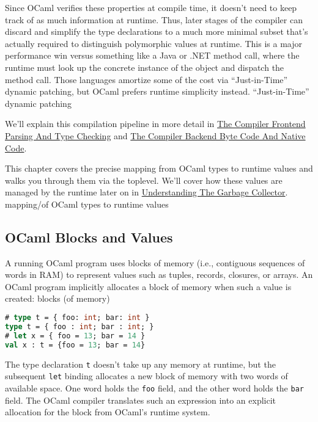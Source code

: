 Since OCaml verifies these properties at compile time, it doesn't need
to keep track of as much information at runtime. Thus, later stages of
the compiler can discard and simplify the type declarations to a much
more minimal subset that's actually required to distinguish polymorphic
values at runtime. This is a major performance win versus something like
a Java or .NET method call, where the runtime must look up the concrete
instance of the object and dispatch the method call. Those languages
amortize some of the cost via ``Just-in-Time'' dynamic patching, but
OCaml prefers runtime simplicity instead. {``Just-in-Time'' dynamic
patching}

We'll explain this compilation pipeline in more detail in
\href{compiler-frontend.html\#the-compiler-frontend-parsing-and-type-checking}{The
Compiler Frontend Parsing And Type Checking} and
\href{compiler-backend.html\#the-compiler-backend-byte-code-and-native-code}{The
Compiler Backend Byte Code And Native Code}.

This chapter covers the precise mapping from OCaml types to runtime
values and walks you through them via the toplevel. We'll cover how
these values are managed by the runtime later on in
\href{garbage-collector.html\#understanding-the-garbage-collector}{Understanding
The Garbage Collector}. \protect\hypertarget{MAPocaml}{}{mapping/of
OCaml types to runtime values}

\hypertarget{ocaml-blocks-and-values}{%
\subsection{OCaml Blocks and Values}\label{ocaml-blocks-and-values}}

A running OCaml program uses blocks of memory (i.e., contiguous
sequences of words in RAM) to represent values such as tuples, records,
closures, or arrays. An OCaml program implicitly allocates a block of
memory when such a value is created: \protect\hypertarget{blck}{}{blocks
(of memory)}

\begin{lstlisting}[language=Caml]
# type t = { foo: int; bar: int }
type t = { foo : int; bar : int; }
# let x = { foo = 13; bar = 14 }
val x : t = {foo = 13; bar = 14}
\end{lstlisting}

The type declaration \passthrough{\lstinline!t!} doesn't take up any
memory at runtime, but the subsequent \passthrough{\lstinline!let!}
binding allocates a new block of memory with two words of available
space. One word holds the \passthrough{\lstinline!foo!} field, and the
other word holds the \passthrough{\lstinline!bar!} field. The OCaml
compiler translates such an expression into an explicit allocation for
the block from OCaml's runtime system.


